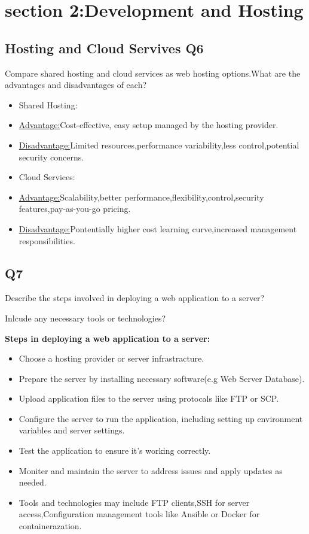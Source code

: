 \documentclass{article}
\begin{document}
\section{section 2:Development and Hosting}
\subsection{Hosting and Cloud Servives Q6}Compare shared hosting and cloud services as web hosting options.What are the advantages and disadvantages of each?
\begin{itemize}
    \item Shared Hosting:
    \item \underline{Advantage:}Cost-effective, easy setup managed by the hosting provider.
    \item \underline{Disadvantage:}Limited resources,performance variability,less control,potential security concerns.
    \item Cloud Services:
    \item \underline{Advantage:}Scalability,better performance,flexibility,control,security features,pay-as-you-go pricing.
    \item \underline{Disadvantage:}Pontentially higher cost learning curve,increased management responsibilities.
\end{itemize}

\subsection{Q7}Describe the steps involved in deploying a web application to a server?\par Inlcude any necessary tools or technologies?\par
\textbf{Steps in deploying a web application to a server:}
\begin{itemize}
    \item Choose a hosting provider or server infrastracture.
    \item Prepare the server by installing necessary software(e.g Web Server Database).
    \item Upload application files to the server using protocals like FTP or SCP.
    \item Configure the server to run the application, including setting up environment variables and server settings.
    \item Test the application to ensure it's working correctly.
    \item Moniter and maintain the server to address issues and apply updates as needed.
    \item Tools and technologies may include FTP clients,SSH for server access,Configuration management tools like Ansible or Docker for containerazation.
\end{itemize}
\end{document}

